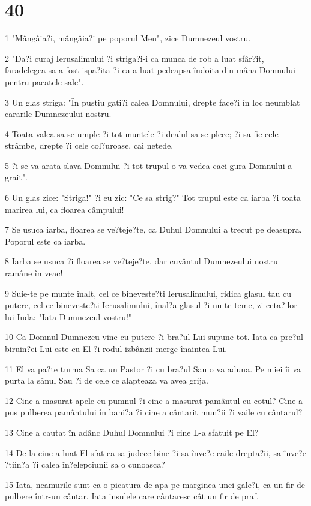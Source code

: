 \chapter{40}

\par 1 "Mângâia?i, mângâia?i pe poporul Meu", zice Dumnezeul vostru.
\par 2 "Da?i curaj Ierusalimului ?i striga?i-i ca munca de rob a luat sfâr?it, faradelegea sa a fost ispa?ita ?i ca a luat pedeapsa îndoita din mâna Domnului pentru pacatele sale".
\par 3 Un glas striga: "În pustiu gati?i calea Domnului, drepte face?i în loc neumblat cararile Dumnezeului nostru.
\par 4 Toata valea sa se umple ?i tot muntele ?i dealul sa se plece; ?i sa fie cele strâmbe, drepte ?i cele col?uroase, cai netede.
\par 5 ?i se va arata slava Domnului ?i tot trupul o va vedea caci gura Domnului a grait".
\par 6 Un glas zice: "Striga!" ?i eu zic: "Ce sa strig?" Tot trupul este ca iarba ?i toata marirea lui, ca floarea câmpului!
\par 7 Se usuca iarba, floarea se ve?teje?te, ca Duhul Domnului a trecut pe deasupra. Poporul este ca iarba.
\par 8 Iarba se usuca ?i floarea se ve?teje?te, dar cuvântul Dumnezeului nostru ramâne în veac!
\par 9 Suie-te pe munte înalt, cel ce bineveste?ti Ierusalimului, ridica glasul tau cu putere, cel ce bineveste?ti Ierusalimului, înal?a glasul ?i nu te teme, zi ceta?ilor lui Iuda: "Iata Dumnezeul vostru!"
\par 10 Ca Domnul Dumnezeu vine cu putere ?i bra?ul Lui supune tot. Iata ca pre?ul biruin?ei Lui este cu El ?i rodul izbânzii merge înaintea Lui.
\par 11 El va pa?te turma Sa ca un Pastor ?i cu bra?ul Sau o va aduna. Pe miei îi va purta la sânul Sau ?i de cele ce alapteaza va avea grija.
\par 12 Cine a masurat apele cu pumnul ?i cine a masurat pamântul cu cotul? Cine a pus pulberea pamântului în bani?a ?i cine a cântarit mun?ii ?i vaile cu cântarul?
\par 13 Cine a cautat în adânc Duhul Domnului ?i cine L-a sfatuit pe El?
\par 14 De la cine a luat El sfat ca sa judece bine ?i sa înve?e caile drepta?ii, sa înve?e ?tiin?a ?i calea în?elepciunii sa o cunoasca?
\par 15 Iata, neamurile sunt ca o picatura de apa pe marginea unei gale?i, ca un fir de pulbere într-un cântar. Iata insulele care cântaresc cât un fir de praf.
